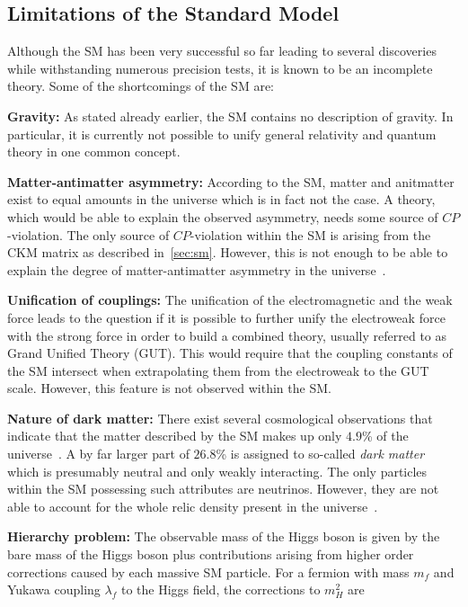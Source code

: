 \subsection{Limitations of the Standard Model}
\label{subsec:sm_shortcomings}
Although the SM has been very successful so far leading to several discoveries while withstanding numerous precision tests, it is known to be an incomplete theory. Some of the shortcomings of the SM are:
\begin{description}
\item \textbf{Gravity:} As stated already earlier, the SM contains no description of gravity. In particular, it is currently not possible to unify general relativity and quantum theory in one common concept.
\item \textbf{Matter-antimatter asymmetry:} According to the SM, matter and anitmatter exist to equal amounts in the universe which is in fact not the case. A theory, which would be able to explain the observed asymmetry, needs some source of $CP$-violation. The only source of $CP$-violation within the SM is arising from the CKM matrix as described in~\ref{sec:sm}. However, this is not enough to be able to explain the degree of matter-antimatter asymmetry in the universe~\cite{bib:CPViolation}.    
\item \textbf{Unification of couplings:} The unification of the electromagnetic and the weak force leads to the question if it is possible to further unify the electroweak force with the strong force in order to build a combined theory, usually referred to as Grand Unified Theory (GUT). This would require that the coupling constants of the SM intersect when extrapolating them from the electroweak to the GUT scale. However, this feature is not observed within the SM.
\item \textbf{Nature of dark matter:} There exist several cosmological observations that indicate that the matter described by the SM makes up only $4.9$\% of the universe~\cite{Ade:2013zuv}. A by far larger part of $26.8$\% is assigned to so-called \textit{dark matter} which is presumably neutral and only weakly interacting. The only particles within the SM possessing such attributes are neutrinos. However, they are not able to account for the whole relic density present in the universe~\cite{Bertone:2004pz}. 
\item \textbf{Hierarchy problem:} The observable mass of the Higgs boson is given by the bare mass of the Higgs boson plus contributions arising from higher order corrections caused by each massive SM particle. For a fermion with mass $m_f$ and Yukawa coupling $\lambda_f$ to the Higgs field, the corrections to $m_H^2$ are

\end{description}

